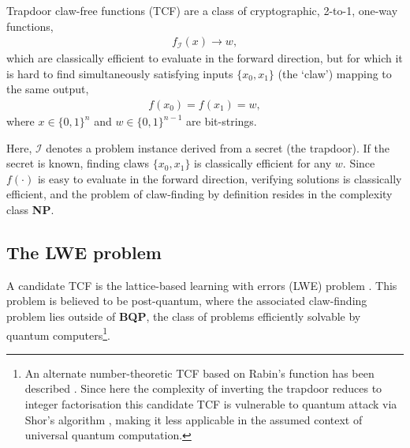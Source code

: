Trapdoor claw-free functions (TCF) are a class of cryptographic, 2-to-1, one-way functions,
\begin{align}
	f_\mathcal{I}(x)\to w,
\end{align}
which are classically efficient to evaluate in the forward direction, but for which it is hard to find simultaneously satisfying inputs $\{x_0,x_1\}$ (the `claw') mapping to the same output,
\begin{align}
	f(x_0)=f(x_1)=w,
\end{align}
where $x\in \{0,1\}^n$ and $w\in\{0,1\}^{n-1}$ are bit-strings.

Here, $\mathcal{I}$ denotes a problem instance derived from a secret (the trapdoor). If the secret is known, finding claws $\{x_0,x_1\}$ is classically efficient for any $w$. Since $f(\cdot)$ is easy to evaluate in the forward direction, verifying solutions is classically efficient, and the problem of  claw-finding by definition resides in the complexity class \textbf{NP}. %


\subsection{The LWE problem}

A candidate TCF is the lattice-based learning with errors (LWE) problem \cite{Goldwasser85, Regev09, Regev10}. This problem is believed to be post-quantum, where the associated claw-finding problem lies outside of \textbf{BQP}, the class of problems efficiently solvable by quantum computers\footnote{An alternate number-theoretic TCF based on Rabin's function has been described \cite{Rabin79, Goldwasser88}. Since here the complexity of inverting the trapdoor reduces to integer factorisation this candidate TCF is vulnerable to quantum attack via Shor's algorithm \cite{Shor97}, making it less applicable in the assumed context of universal quantum computation.}.

